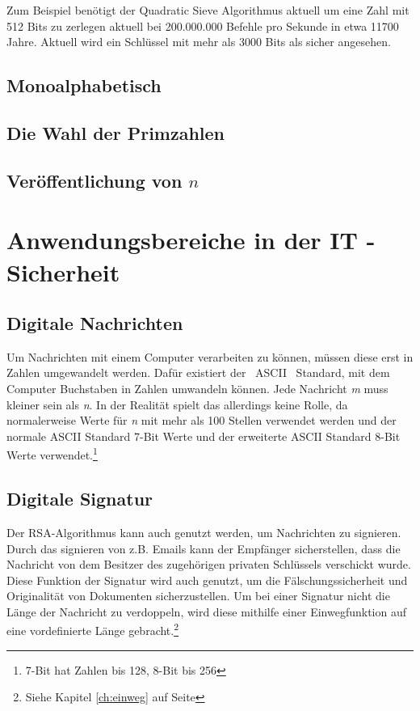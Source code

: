 \documentclass[12pt,a4paper]{scrartcl}
\begin{document}
	Zum Beispiel benötigt der Quadratic Sieve Algorithmus aktuell um eine Zahl mit 512 Bits zu zerlegen aktuell bei 200.000.000 Befehle pro Sekunde in etwa 11700 Jahre. \cite[S. 115]{Beutelspacher2015-jl}
	Aktuell wird ein Schlüssel mit mehr als 3000 Bits als sicher angesehen. \cite[29]{bsireco}
	 
	\subsection{Monoalphabetisch}
	\subsection{Die Wahl der Primzahlen}
	\label{chap:primnumberselection}
	\subsection{Veröffentlichung von $n$}

\pagebreak

\section{Anwendungsbereiche in der IT - Sicherheit}
	\subsection{Digitale Nachrichten}
Um Nachrichten mit einem Computer verarbeiten zu können, müssen diese erst in Zahlen umgewandelt werden. Dafür existiert der ~ASCII~ Standard, mit dem Computer Buchstaben in Zahlen umwandeln können. Jede Nachricht \textit{m} muss kleiner sein als \textit{n}. In der Realität spielt das allerdings keine Rolle, da normalerweise Werte für \textit{n} mit mehr als 100 Stellen verwendet werden und der normale ASCII Standard 7-Bit Werte und der erweiterte ASCII Standard 8-Bit Werte verwendet.\footnote{7-Bit hat Zahlen bis 128, 8-Bit bis 256}
	
	\subsection{Digitale Signatur}
	Der RSA-Algorithmus kann auch genutzt werden, um Nachrichten zu signieren. Durch das signieren von z.B. Emails kann der Empfänger sicherstellen, dass die Nachricht von dem Besitzer des zugehörigen privaten Schlüssels verschickt wurde. Diese Funktion der Signatur wird auch genutzt, um die Fälschungssicherheit und Originalität von  Dokumenten sicherzustellen. Um bei einer Signatur nicht die Länge der Nachricht zu verdoppeln, wird diese mithilfe einer Einwegfunktion auf eine vordefinierte Länge gebracht.\footnote{Siehe Kapitel \ref{ch:einweg} auf Seite \pageref{ch:einweg}}\\
\end{document}
